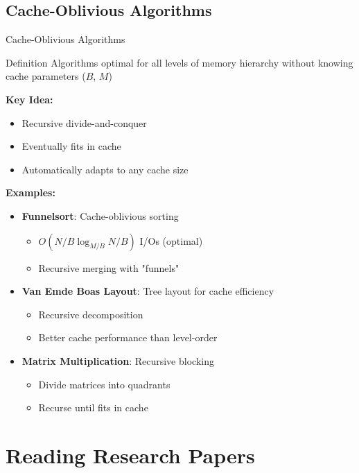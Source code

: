 \documentclass[aspectratio=169,xcolor=dvipsnames]{beamer}
\begin{document}
\subsection{Cache-Oblivious Algorithms}

\begin{frame}{Cache-Oblivious Algorithms}
  \begin{block}{Definition}
    Algorithms optimal for all levels of memory hierarchy without knowing cache parameters ($B$, $M$)
  \end{block}

  \vspace{0.3cm}
  \textbf{Key Idea:}
  \begin{itemize}
    \item Recursive divide-and-conquer
    \item Eventually fits in cache
    \item Automatically adapts to any cache size
  \end{itemize}

  \vspace{0.3cm}
  \textbf{Examples:}
  \begin{itemize}
    \item \textbf{Funnelsort}: Cache-oblivious sorting
    \begin{itemize}
      \item $O(N/B \log_{M/B} N/B)$ I/Os (optimal)
      \item Recursive merging with "funnels"
    \end{itemize}
    \item \textbf{Van Emde Boas Layout}: Tree layout for cache efficiency
    \begin{itemize}
      \item Recursive decomposition
      \item Better cache performance than level-order
    \end{itemize}
    \item \textbf{Matrix Multiplication}: Recursive blocking
    \begin{itemize}
      \item Divide matrices into quadrants
      \item Recurse until fits in cache
    \end{itemize}
  \end{itemize}
\end{frame}

\section{Reading Research Papers}
\end{document}
